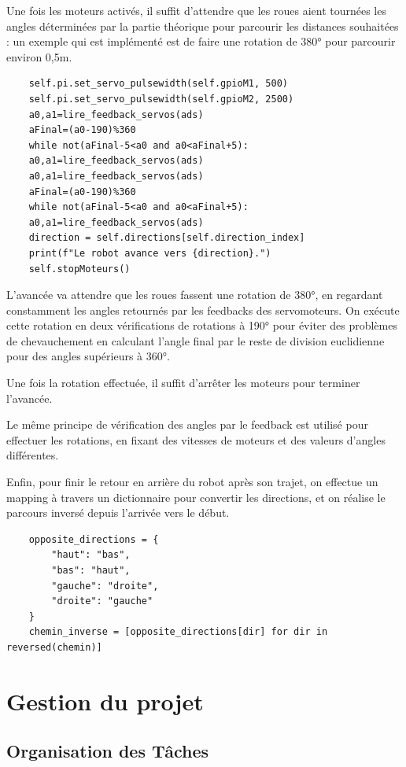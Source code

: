 \documentclass[a4paper,12pt]{report}  %
\begin{document}
Une fois les moteurs activés, il suffit d’attendre que les roues aient tournées les angles déterminées par la partie théorique pour parcourir les distances souhaitées : un exemple qui est implémenté est de faire une rotation de 380° pour parcourir environ 0,5m.

\begin{lstlisting}
	self.pi.set_servo_pulsewidth(self.gpioM1, 500)
	self.pi.set_servo_pulsewidth(self.gpioM2, 2500)
	a0,a1=lire_feedback_servos(ads)
	aFinal=(a0-190)%360
	while not(aFinal-5<a0 and a0<aFinal+5):
	a0,a1=lire_feedback_servos(ads)
	a0,a1=lire_feedback_servos(ads)
	aFinal=(a0-190)%360
	while not(aFinal-5<a0 and a0<aFinal+5):
	a0,a1=lire_feedback_servos(ads)
	direction = self.directions[self.direction_index]
	print(f"Le robot avance vers {direction}.")
	self.stopMoteurs()
\end{lstlisting}


L’avancée va attendre que les roues fassent une rotation de 380°, en regardant constamment les angles retournés par les feedbacks des servomoteurs. On exécute cette rotation en deux vérifications de rotations à 190° pour éviter des problèmes de chevauchement en calculant l’angle final par le reste de division euclidienne pour des angles supérieurs à 360°.

Une fois la rotation effectuée, il suffit d’arrêter les moteurs pour terminer l’avancée.

Le même principe de vérification des angles par le feedback est utilisé pour effectuer les rotations, en fixant des vitesses de moteurs et des valeurs d’angles différentes.

Enfin, pour finir le retour en arrière du robot après son trajet, on effectue un mapping à travers un dictionnaire pour convertir les directions, et on réalise le parcours inversé depuis l’arrivée vers le début.

\begin{lstlisting}
	opposite_directions = {
		"haut": "bas",
		"bas": "haut",
		"gauche": "droite",
		"droite": "gauche"
	}
	chemin_inverse = [opposite_directions[dir] for dir in reversed(chemin)]
\end{lstlisting}


\section{Gestion du projet}

\subsection{Organisation des Tâches} 
\end{document}
